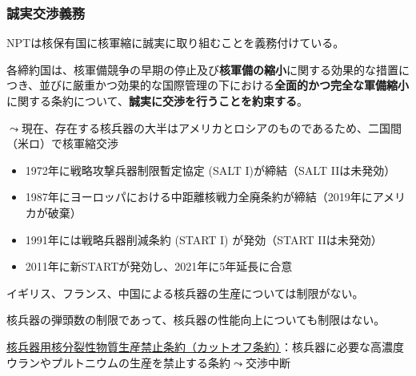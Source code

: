 \documentclass[
  xelatex,
  ja=standard]{bxjsarticle}
\providecommand{\tightlist}{%
  \setlength{\itemsep}{0pt}\setlength{\parskip}{0pt}}\usepackage{longtable,booktabs,array}
\begin{document}
\hypertarget{ux8aa0ux5b9fux4ea4ux6e09ux7fa9ux52d9}{%
\subsubsection{誠実交渉義務}\label{ux8aa0ux5b9fux4ea4ux6e09ux7fa9ux52d9}}

NPTは核保有国に核軍縮に誠実に取り組むことを義務付けている。

\begin{tcolorbox}[enhanced jigsaw, left=2mm, toprule=.15mm, opacityback=0, colframe=quarto-callout-note-color-frame, opacitybacktitle=0.6, breakable, coltitle=black, colbacktitle=quarto-callout-note-color!10!white, colback=white, bottomtitle=1mm, toptitle=1mm, titlerule=0mm, title=\textcolor{quarto-callout-note-color}{\faInfo}\hspace{0.5em}{\href{https://www1.doshisha.ac.jp/~karai/intlaw/docs/npt.htm}{核兵器不拡散条約}　第6条}, arc=.35mm, rightrule=.15mm, bottomrule=.15mm, leftrule=.75mm]

各締約国は、核軍備競争の早期の停止及び\textbf{核軍備の縮小}に関する効果的な措置につき、並びに厳重かつ効果的な国際管理の下における\textbf{全面的かつ完全な軍備縮小}に関する条約について、\textbf{誠実に交渉を行うことを約束する}。

\end{tcolorbox}

\(\leadsto\)現在、存在する核兵器の大半はアメリカとロシアのものであるため、二国間（米ロ）で核軍縮交渉

\begin{itemize}
\tightlist
\item
  1972年に戦略攻撃兵器制限暫定協定 (SALT I)が締結（SALT IIは未発効）
\item
  1987年にヨーロッパにおける中距離核戦力全廃条約が締結（2019年にアメリカが破棄）
\item
  1991年には戦略兵器削減条約 (START I) が発効（START IIは未発効）
\item
  2011年に新STARTが発効し、2021年に5年延長に合意
\end{itemize}

イギリス、フランス、中国による核兵器の生産については制限がない。

核兵器の弾頭数の制限であって、核兵器の性能向上についても制限はない。

\href{https://www.mofa.go.jp/mofaj/gaiko/kaku/fmct/index.html}{核兵器用核分裂性物質生産禁止条約（カットオフ条約）}：核兵器に必要な高濃度ウランやプルトニウムの生産を禁止する条約\(\leadsto\)交渉中断
\end{document}
